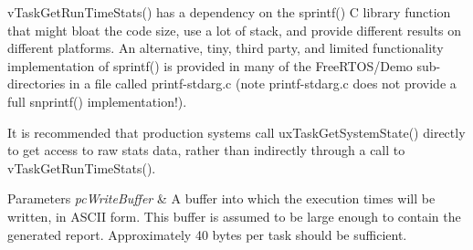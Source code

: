 v\+Task\+Get\+Run\+Time\+Stats() has a dependency on the sprintf() C library function that might bloat the code size, use a lot of stack, and provide different results on different platforms. An alternative, tiny, third party, and limited functionality implementation of sprintf() is provided in many of the Free\+R\+T\+O\+S/\+Demo sub-\/directories in a file called printf-\/stdarg.\+c (note printf-\/stdarg.\+c does not provide a full snprintf() implementation!).

It is recommended that production systems call ux\+Task\+Get\+System\+State() directly to get access to raw stats data, rather than indirectly through a call to v\+Task\+Get\+Run\+Time\+Stats().


\begin{DoxyParams}{Parameters}
{\em pc\+Write\+Buffer} & A buffer into which the execution times will be written, in A\+S\+C\+I\+I form. This buffer is assumed to be large enough to contain the generated report. Approximately 40 bytes per task should be sufficient. \\
\hline
\end{DoxyParams}
